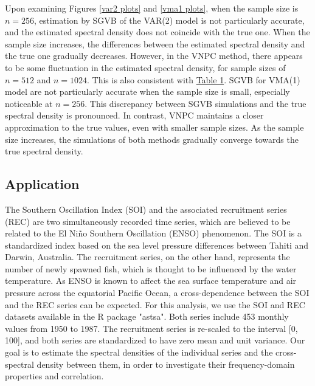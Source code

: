 \documentclass[12pt,a4paper]{article}
\begin{document}
Upon examining Figures \ref{var2 plots} and \ref{vma1 plots}, when the sample size is $n=256$, estimation by SGVB of the VAR(2) model is not particularly accurate, and the estimated spectral density does not coincide with the true one. When the sample size increases, the differences between the estimated spectral density and the true one gradually decreases. However, in the VNPC method, there appears to be some fluctuation in the estimated spectral density, for sample sizes of $n=512$ and $n=1024$. This is also consistent with \hyperref[table l1l2 var2]{Table 1}. SGVB for VMA(1) model are not particularly accurate when the sample size is small, especially noticeable at $n=256$. This discrepancy between SGVB simulations and the true spectral density is pronounced. In contrast, VNPC maintains a closer approximation to the true values, even with smaller sample sizes. As the sample size increases, the simulations of both methods gradually converge towards the true spectral density.

\subsection{Application}
The Southern Oscillation Index (SOI) and the associated recruitment series (REC) are two simultaneously recorded time series, which are believed to be related to the El Niño Southern Oscillation (ENSO) phenomenon. The SOI is a standardized index based on the sea level pressure differences between Tahiti and Darwin, Australia. The recruitment series, on the other hand, represents the number of newly spawned fish, which is thought to be influenced by the water temperature. As ENSO is known to affect the sea surface temperature and air pressure across the equatorial Pacific Ocean, a cross-dependence between the SOI and the REC series can be expected. For this analysis, we use the SOI and REC datasets available in the R package "astsa". Both series include 453 monthly values from 1950 to 1987. The recruitment series is re-scaled to the interval [0, 100], and both series are standardized to have zero mean and unit variance. Our goal is to estimate the spectral densities of the individual series and the cross-spectral density between them, in order to investigate their frequency-domain properties and correlation.
\end{document}
